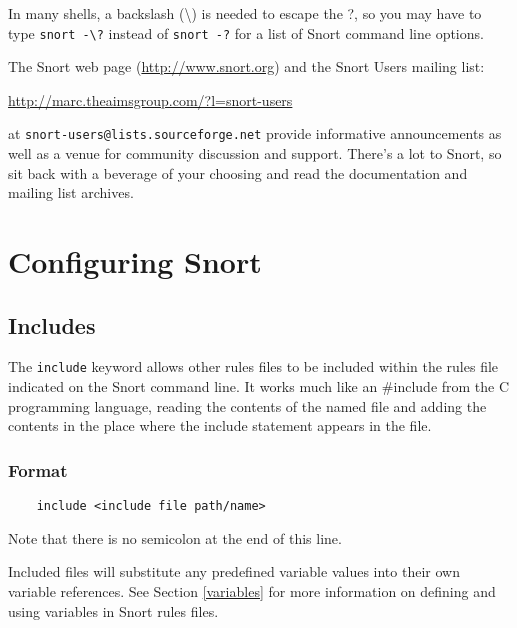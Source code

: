 \documentclass[english]{report}
\newenvironment{note}{
\samepage
    \vspace{10pt}{\textsf{
        {\hspace{7pt}\Huge{$\triangle$\hspace{-12.5pt}{\Large{$^!$}}}}\hspace{5pt}
        {\Large{NOTE}}
    }
    }
   \begin{center}
    \par\vspace{-17pt}

    \begin{lrbox}{\savepar}
    \begin{minipage}[r]{6in}
}
{
    \end{minipage}
    \end{lrbox}
    \fbox{
        \usebox{
            \savepar
	}
    }
    \par\vskip10pt
    \end{center}
}
\newenvironment{note}{
        \begin{rawhtml}
        <p><table border="1"><tr><td><b>
        Note:&nbsp;&nbsp;</b>
        \end{rawhtml}
}{
        \begin{rawhtml}
        </b></td></tr></table></p>
        \end{rawhtml}
}
\begin{document}
\begin{note}

In many shells, a backslash (\textbackslash{}) is needed to escape the ?, so
you may have to type \texttt{snort -\textbackslash{}?} instead of \texttt{snort
-?} for a list of Snort command line options.

\end{note}

The Snort web page (\url{http://www.snort.org}) and the Snort Users mailing
list:

\url{http://marc.theaimsgroup.com/?l=snort-users}

at \verb?snort-users@lists.sourceforge.net? provide informative announcements
as well as a venue for community discussion and support. There's a lot to
Snort, so sit back with a beverage of your choosing and read the documentation
and mailing list archives.

\chapter{Configuring Snort}
\label{Configuring Snort}

\section{Includes}

The {\tt include} keyword allows other rules files to be included within the
rules file indicated on the Snort command line. It works much like an \#include
from the C programming language, reading the contents of the named file and
adding the contents in the place where the include statement appears in the
file.

\subsection{Format}
\begin{verbatim}
    include <include file path/name>
\end{verbatim}

\begin{note}

Note that there is no semicolon at the end of this line. 

\end{note}

Included files will substitute any predefined variable values into their own
variable references.  See Section \ref{variables} for more information on
defining and using variables in Snort rules files.
\end{document}
